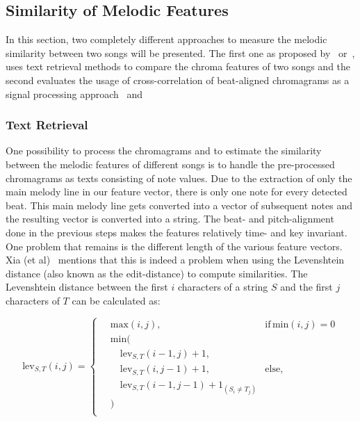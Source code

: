 \subsection{Similarity of Melodic Features}

In this section, two completely different approaches to measure the melodic similarity between two songs will be presented. The first one as proposed by~\cite{chroma1} or~\cite{chroma4}, uses text retrieval methods to compare the chroma features of two songs and the second evaluates the usage of cross-correlation of beat-aligned chromagrams as a signal processing approach~\cite{chroma2} and~\cite{chroma3}

\subsubsection{Text Retrieval}\label{textretr}

One possibility to process the chromagrams and to estimate the similarity between the melodic features of different songs is to handle the pre-processed chromagrams as texts consisting of note values. Due to the extraction of only the main melody line in our feature vector, there is only one note for every detected beat. This main melody line gets converted into a vector of subsequent notes and the resulting vector is converted into a string. The beat- and pitch-alignment done in the previous steps makes the features relatively time- and key invariant. One problem that remains is the different length of the various feature vectors. Xia (et al)~\cite{chroma4} mentions that this is indeed a problem when using the Levenshtein distance (also known as the edit-distance) to compute similarities. The Levenshtein distance between the first $i$ characters of a string $S$ and the first $j$ characters of $T$ can be calculated as:

\begin{equation} \label{eq:tr1}
\text{lev}_{S,T}(i, j) = \begin{cases}
\quad\text{max}(i, j), & \text{if} \, \text{min}(i, j) = 0\\
\quad\text{min}(\\
	\quad\quad\text{lev}_{S,T}(i-1, j) + 1,\\ 
	\quad\quad\text{lev}_{S,T}(i, j-1) + 1,	& \text{else},\\
	\quad\quad\text{lev}_{S,T}(i-1, j-1) + 1_{(S_i \neq T_j)}\\
	\quad)\\ 
	\end{cases}
\end{equation}

